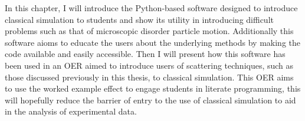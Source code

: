 In this chapter, I will introduce the Python-based software designed to introduce classical simulation to students and show its utility in introducing difficult problems such as that of microscopic disorder particle motion.
Additionally this software aioms to educate the users about the underlying methods by making the code available and easily accessible.
Then I will present how this software has been used in an OER aimed to introduce users of scattering techniques, such as those discussed previously in this thesis, to classical simulation.
This OER aims to use the worked example effect to engage students in literate programming, this will hopefully reduce the barrier of entry to the use of classical simulation to aid in the analysis of experimental data. 
